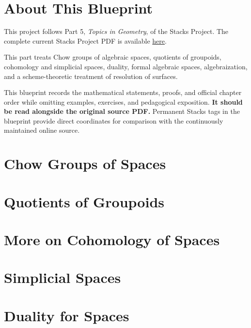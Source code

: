 

\chapter*{About This Blueprint}

This project follows Part 5, \emph{Topics in Geometry}, of the Stacks Project.
The complete current Stacks Project PDF is available
\href{https://stacks.math.columbia.edu/download/book.pdf}{here}.

This part treats Chow groups of algebraic spaces, quotients of groupoids,
cohomology and simplicial spaces, duality, formal algebraic spaces,
algebraization, and a scheme-theoretic treatment of resolution of surfaces.

This blueprint records the mathematical statements, proofs, and official
chapter order while omitting examples, exercises, and pedagogical exposition.
\textbf{It should be read alongside the original source PDF.} Permanent Stacks
tags in the blueprint provide direct coordinates for comparison with the
continuously maintained online source.

\chapter{Chow Groups of Spaces}
\label{chap:spaces-chow}


\chapter{Quotients of Groupoids}
\label{chap:groupoids-quotients}


\chapter{More on Cohomology of Spaces}
\label{chap:spaces-more-cohomology}


\chapter{Simplicial Spaces}
\label{chap:spaces-simplicial}


\chapter{Duality for Spaces}
\label{chap:spaces-duality}


